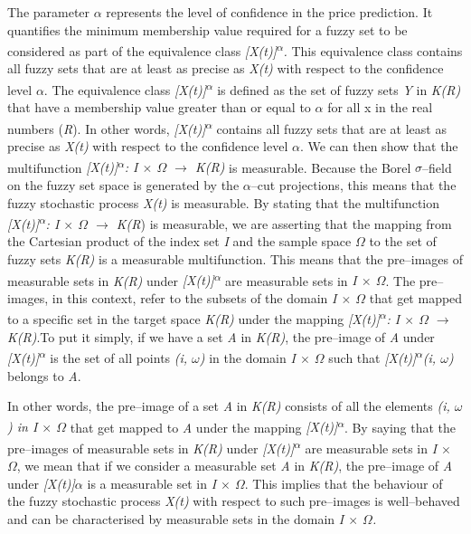 \documentclass[12pt,a4paper]{report}
\numberwithin{equation}{section}
\begin{document}
The parameter $\alpha$ represents the level of confidence in the price
prediction. It quantifies the minimum membership value required for a
fuzzy set to be considered as part of the equivalence class
\emph{{[}X(t){]}\textsuperscript{$\alpha$}.} This equivalence class contains
all fuzzy sets that are at least as precise as \emph{X(t)} with respect
to the confidence level \emph{$\alpha$}. The equivalence class
\emph{{[}X(t){]}\textsuperscript{$\alpha$}} is defined as the set of fuzzy sets
\emph{Y} in \emph{K(R)} that have a membership value greater than or
equal to $\alpha$ for all x in the real numbers (\emph{R}). In other words,
\emph{{[}X(t){]}\textsuperscript{$\alpha$}} contains all fuzzy sets that are at
least as precise as \emph{X(t)} with respect to the confidence level
\emph{$\alpha$}. We can then show that the multifunction
\emph{{[}X(t){]}\textsuperscript{$\alpha$}: I $\times$ $\Omega$ $\rightarrow$ K(R)} is measurable.
Because the Borel \emph{$\sigma$}--field on the fuzzy set space is generated by
the $\alpha$--cut projections, this means that the fuzzy stochastic process
\emph{X(t)} is measurable. By stating that the multifunction
\emph{{[}X(t){]}\textsuperscript{$\alpha$}: I $\times$ $\Omega$ $\rightarrow$ K(R}) is measurable, we are
asserting that the mapping from the Cartesian product of the index set
\emph{I} and the sample space \emph{$\Omega$} to the set of fuzzy sets
\emph{K(R)} is a measurable multifunction. This means that the
pre--images of measurable sets in \emph{K(R)} under
\emph{{[}X(t){]}\textsuperscript{$\alpha$}} are measurable sets in \emph{I $\times$
$\Omega$}. The pre--images, in this context, refer to the subsets of the domain
\emph{I $\times$ $\Omega$} that get mapped to a specific set in the target space
\emph{K(R)} under the mapping \emph{{[}X(t){]}\textsuperscript{$\alpha$}: I $\times$ $\Omega$
$\rightarrow$ K(R)}.To put it simply, if we have a set \emph{A} in \emph{K(R)}, the
pre--image of \emph{A} under \emph{{[}X(t){]}\textsuperscript{$\alpha$}} is the
set of all points \emph{(i, $\omega$)} in the domain \emph{I $\times$ $\Omega$} such that
\emph{{[}X(t){]}\textsuperscript{$\alpha$}(i, $\omega$)} belongs to \emph{A}.

In other words, the pre--image of a set \emph{A} in \emph{K(R)} consists
of all the elements \emph{(i, $\omega$) in I $\times$ $\Omega$} that get mapped to \emph{A}
under the mapping \emph{{[}X(t){]}\textsuperscript{$\alpha$}}. By saying that
the pre--images of measurable sets in \emph{K(R)} under
\emph{{[}X(t){]}\textsuperscript{$\alpha$}} are measurable sets in \emph{I $\times$
$\Omega$}, we mean that if we consider a measurable set \emph{A} in
\emph{K(R)}, the pre--image of \emph{A} under \emph{{[}X(t){]}$\alpha$} is a
measurable set in \emph{I $\times$ $\Omega$}. This implies that the behaviour of the
fuzzy stochastic process \emph{X(t)} with respect to such pre--images is
well--behaved and can be characterised by measurable sets in the domain
\emph{I $\times$ $\Omega$.}
\end{document}
